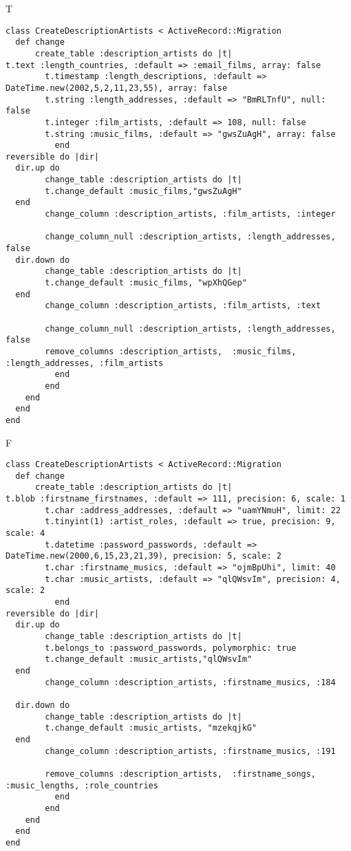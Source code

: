 T
\begin{verbatim}
class CreateDescriptionArtists < ActiveRecord::Migration
  def change
	  create_table :description_artists do |t|
t.text :length_countries, :default => :email_films, array: false
		t.timestamp :length_descriptions, :default => DateTime.new(2002,5,2,11,23,55), array: false
		t.string :length_addresses, :default => "BmRLTnfU", null: false
		t.integer :film_artists, :default => 108, null: false
		t.string :music_films, :default => "gwsZuAgH", array: false
		  end
reversible do |dir|
  dir.up do
		change_table :description_artists do |t|
		t.change_default :music_films,"gwsZuAgH"
  end
 		change_column :description_artists, :film_artists, :integer
   
		change_column_null :description_artists, :length_addresses,  false
  dir.down do
		change_table :description_artists do |t|
		t.change_default :music_films, "wpXhQGep"
  end
 		change_column :description_artists, :film_artists, :text
   
		change_column_null :description_artists, :length_addresses, false
 		remove_columns :description_artists,  :music_films, :length_addresses, :film_artists 
	      end
	    end
    end 
  end
end

\end{verbatim}

F
\begin{verbatim}
class CreateDescriptionArtists < ActiveRecord::Migration
  def change
	  create_table :description_artists do |t|
t.blob :firstname_firstnames, :default => 111, precision: 6, scale: 1
		t.char :address_addresses, :default => "uamYNmuH", limit: 22
		t.tinyint(1) :artist_roles, :default => true, precision: 9, scale: 4
		t.datetime :password_passwords, :default => DateTime.new(2000,6,15,23,21,39), precision: 5, scale: 2
		t.char :firstname_musics, :default => "ojmBpUhi", limit: 40
		t.char :music_artists, :default => "qlQWsvIm", precision: 4, scale: 2
		  end
reversible do |dir|
  dir.up do
		change_table :description_artists do |t|
		t.belongs_to :password_passwords, polymorphic: true
 		t.change_default :music_artists,"qlQWsvIm"
  end
 		change_column :description_artists, :firstname_musics, :184
   
  dir.down do
		change_table :description_artists do |t|
		t.change_default :music_artists, "mzekqjkG"
  end
 		change_column :description_artists, :firstname_musics, :191
   
		remove_columns :description_artists,  :firstname_songs, :music_lengths, :role_countries 
	      end
	    end
    end 
  end
end

\end{verbatim}

